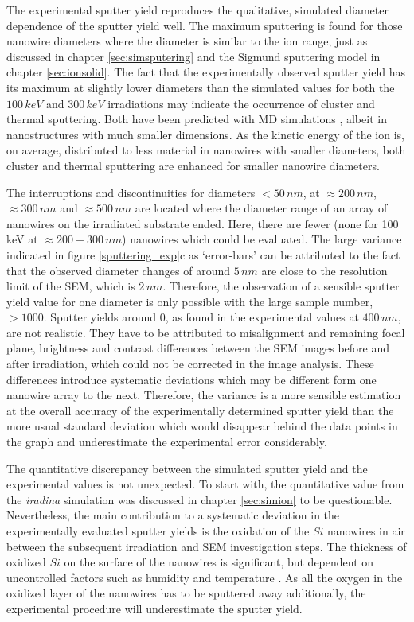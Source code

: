 The experimental sputter yield reproduces the qualitative, simulated diameter dependence of the sputter yield well. The maximum sputtering is found for those nanowire diameters where the diameter is similar to the ion range, just as discussed in chapter \ref{sec:simsputering} and the Sigmund sputtering model in chapter \ref{sec:ionsolid}. The fact that the experimentally observed sputter yield has its maximum at slightly lower diameters than the simulated values for both the $100\,keV$ and $300\,keV$ irradiations may indicate the occurrence of cluster and thermal sputtering. Both have been predicted with MD simulations \cite{nietiadi_sputtering_2014,urbassek_sputter_2015,anders_sputtering_2015}, albeit in nanostructures with much smaller dimensions. As the kinetic energy of the ion is, on average, distributed to less material in nanowires with smaller diameters, both cluster and thermal sputtering are enhanced for smaller nanowire diameters.

The interruptions and discontinuities for diameters $<50\,nm$, at $\approx 200\,nm$, $\approx 300\,nm$ and $\approx 500\,nm$ are located where the diameter range of an array of nanowires on the irradiated substrate ended. Here, there are fewer (none for 100\,keV at $\approx 200 - 300\,nm$) nanowires which could be evaluated. The large variance indicated in figure \ref{sputtering_exp}c as `error-bars' can be attributed to the fact that the observed diameter changes of around $5\,nm$ are close to the resolution limit of the SEM, which is $2\,nm$. Therefore, the observation of a sensible sputter yield value for one diameter is only possible with the large sample number, $>1000$. Sputter yields around 0, as found in the experimental values at $400\,nm$, are not realistic. They have to be attributed to misalignment and remaining focal plane, brightness and contrast differences between the SEM images before and after irradiation, which could not be corrected in the image analysis. These differences introduce systematic deviations which may be different form one nanowire array to the next. Therefore, the variance is a more sensible estimation at the overall accuracy of the experimentally determined sputter yield than the more usual standard deviation which would disappear behind the data points in the graph and underestimate the experimental error considerably.

The quantitative discrepancy between the simulated sputter yield and the experimental values is not unexpected. To start with, the quantitative value from the \emph{iradina} simulation was discussed in chapter \ref{sec:simion} to be questionable. Nevertheless, the main contribution to a systematic deviation in the experimentally evaluated sputter yields is the oxidation of the $Si$ nanowires in air between the subsequent irradiation and SEM investigation steps. The thickness of oxidized $Si$ on the surface of the nanowires is significant, but dependent on uncontrolled factors such as humidity and temperature \cite{lukes_oxidation_1972,al-bayati_composition_1991}. As all the oxygen in the oxidized layer of the nanowires has to be sputtered away additionally, the experimental procedure will underestimate the sputter yield.

